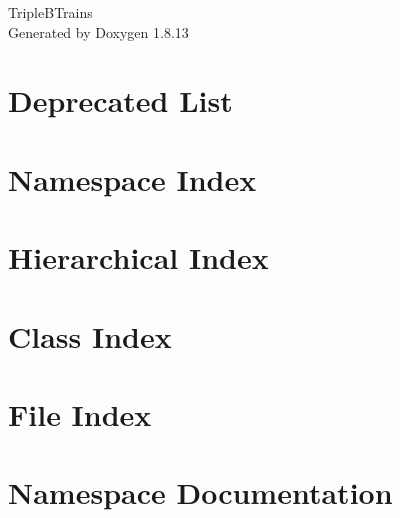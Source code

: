 \documentclass[twoside]{book}
\newcommand{\+}{\discretionary{\mbox{\scriptsize$\hookleftarrow$}}{}{}}
\newcommand{\clearemptydoublepage}{%
  \newpage{\pagestyle{empty}\cleardoublepage}%
}
\begin{document}
\hypersetup{pageanchor=false,
             bookmarksnumbered=true,
             pdfencoding=unicode
            }
\begin{titlepage}
\vspace*{7cm}
\begin{center}%
{\Large Triple\+B\+Trains }\\
\vspace*{1cm}
{\large Generated by Doxygen 1.8.13}\\
\end{center}
\end{titlepage}
\clearemptydoublepage
{}
\tableofcontents
\clearemptydoublepage
{}
\hypersetup{pageanchor=true}

\chapter{Deprecated List}
\label{deprecated}

\chapter{Namespace Index}

\chapter{Hierarchical Index}

\chapter{Class Index}

\chapter{File Index}

\chapter{Namespace Documentation}



\end{document}
